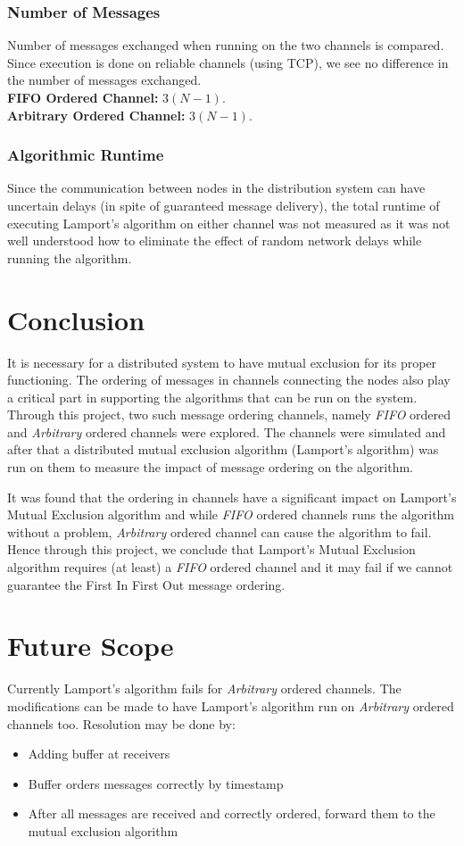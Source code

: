 \documentclass[a4paper, 12pt]{article}
\begin{document}
			\subsubsection{Number of Messages}
				Number of messages exchanged when running on the two channels is compared. Since execution is done on reliable channels (using TCP), we see no difference in the number of messages exchanged.\\
				\indent \textbf{FIFO Ordered Channel:} $3(N-1)$. \\
				\indent \textbf{Arbitrary Ordered Channel:} $3(N-1)$.
				
			\subsubsection{Algorithmic Runtime}
				Since the communication between nodes in the distribution system can have uncertain delays (in spite of guaranteed message delivery), the total runtime of executing Lamport's algorithm on either channel was not measured as it was not well understood how to eliminate the effect of random network delays while running the algorithm.
		
	\section{Conclusion}
		It is necessary for a distributed system to have mutual exclusion for its proper functioning. The ordering of messages in channels connecting the nodes also play a critical part in supporting the algorithms that can be run on the system. Through this project, two such message ordering channels, namely \textit{FIFO} ordered and \textit{Arbitrary} ordered channels were explored. The channels were simulated and after that a distributed mutual exclusion algorithm (Lamport's algorithm) was run on them to measure the impact of message ordering on the algorithm.
		\par It was found that the ordering in channels have a significant impact on Lamport's Mutual Exclusion algorithm and while \textit{FIFO} ordered channels runs the algorithm without a problem, \textit{Arbitrary} ordered channel can cause the algorithm to fail. Hence through this project, we conclude that Lamport's Mutual Exclusion algorithm requires (at least) a \textit{FIFO} ordered channel and it may fail if we cannot guarantee the First In First Out message ordering.
		
	\section{Future Scope}
		Currently Lamport's algorithm fails for \textit{Arbitrary} ordered channels. The modifications can be made to have Lamport's algorithm run on \textit{Arbitrary} ordered channels too. Resolution may be done by:
		\begin{itemize}
			\item Adding buffer at receivers
			\item Buffer orders messages correctly by timestamp
			\item After all messages are received and correctly ordered, forward them to the mutual exclusion algorithm
		\end{itemize}
	
\end{document}
